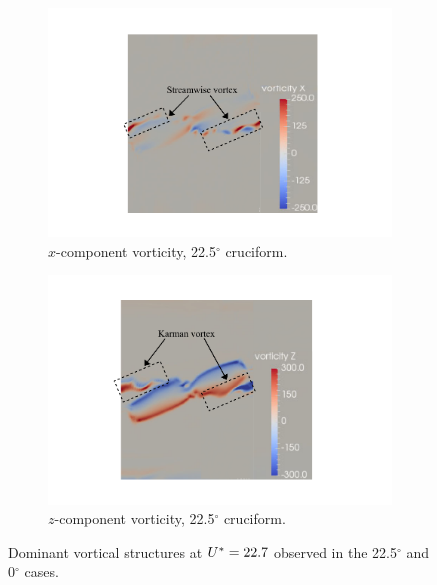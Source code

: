 \documentclass[oneside]{utmthesis}
\begin{document}
\begin{figure}
  \centering
  \begin{subfigure}[h]{1\textwidth}
    \centering
    \includegraphics[width=\textwidth]{figs/vorx225}
    \caption{$x$-component vorticity, 22.5$^{\circ}$ cruciform.}
    \label{fig:vorx225}
  \end{subfigure}

  \begin{subfigure}[h]{1\textwidth}
    \centering
    \includegraphics[width=\textwidth]{figs/vorz225}
    \caption{$z$-component vorticity, 22.5$^{\circ}$ cruciform.}
    \label{fig:vorz225}
  \end{subfigure}
  \caption{Dominant vortical structures at $U^{*} = 22.7$ observed in the 22.5$^{\circ}$ and 0$^{\circ}$ cases.}
\end{figure}
\end{document}
